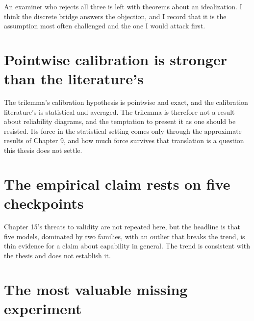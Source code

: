 \documentclass{memoir}
\begin{document}
An examiner who rejects all three is left with theorems about an idealization.
I think the discrete bridge answers the objection, and I record that it is the
assumption most often challenged and the one I would attack first.



\section{Pointwise calibration is stronger than the literature's}\label{Two--Schemas--of--Impossibility-005F-005F-005F--Machine--Checked--Limits--of--Trustworthy--Machine--Learning-005F-005F-005F--and--Why--They--Tighten--with--Capability----Limitations----Pointwise--calibration--is--stronger--than--the--literature-005F-005F-005Fs}

The trilemma's calibration hypothesis is pointwise and exact, and the calibration
literature's is statistical and averaged. The trilemma is therefore not a result
about reliability diagrams, and the temptation to present it as one should be
resisted. Its force in the statistical setting comes only through the
approximate results of Chapter 9, and how much force survives that translation
is a question this thesis does not settle.



\section{The empirical claim rests on five checkpoints}\label{Two--Schemas--of--Impossibility-005F-005F-005F--Machine--Checked--Limits--of--Trustworthy--Machine--Learning-005F-005F-005F--and--Why--They--Tighten--with--Capability----Limitations----The--empirical--claim--rests--on--five--checkpoints}

Chapter 15's threats to validity are not repeated here, but the headline is
that five models, dominated by two families, with an outlier that breaks the
trend, is thin evidence for a claim about capability in general. The trend is
consistent with the thesis and does not establish it.



\section{The most valuable missing experiment}\label{Two--Schemas--of--Impossibility-005F-005F-005F--Machine--Checked--Limits--of--Trustworthy--Machine--Learning-005F-005F-005F--and--Why--They--Tighten--with--Capability----Limitations----The--most--valuable--missing--experiment}
\end{document}
